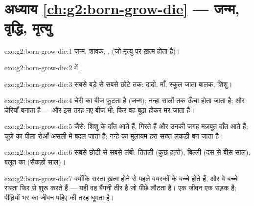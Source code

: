 \section*{अध्याय \ref{ch:g2:born-grow-die} --- जन्म, वृद्धि, मृत्यु}

\begin{solution}{exo:g2:born-grow-die:1}
जन्म, शावक, ,  (जो मृत्यु पर ख़त्म होता है)।
\end{solution}

\begin{solution}{exo:g2:born-grow-die:2}
  में।
\end{solution}

\begin{solution}{exo:g2:born-grow-die:3}
सबसे बड़े से सबसे छोटे तक: दादी, माँ, स्कूल जाता बालक, शिशु।
\end{solution}

\begin{solution}{exo:g2:born-grow-die:4}
चेरी का बीज फूटता है (जन्म); नन्हा  सालों तक ऊँचा होता जाता है;
   और चेरियाँ बनाता है --- और इस तरह नए बीज भी; फिर वह
बूढ़ा होकर मर जाता है।
\end{solution}

\begin{solution}{exo:g2:born-grow-die:5}
जैसे: शिशु के दाँत आते हैं, गिरते हैं और उनकी जगह मज़बूत दाँत आते
हैं; चूज़े का पीला रोआँ असली  में बदल जाता है; नन्हे  का
मुलायम हरा  सख़्त लकड़ी बन जाता है।
\end{solution}

\begin{solution}{exo:g2:born-grow-die:6}
सबसे छोटी से सबसे लंबी: तितली (कुछ हफ़्ते), बिल्ली (दस से बीस साल),
बलूत का  (सैकड़ों साल)।
\end{solution}

\begin{solution}{exo:g2:born-grow-die:7}
क्योंकि रास्ता ख़त्म होने से पहले वयस्कों के बच्चे होते हैं, और वे
बच्चे रास्ता फिर से शुरू करते हैं --- यही वह बैंगनी तीर है जो पीछे
लौटता है। एक जीवन एक सड़क है; पीढ़ियों भर का जीवन पहिए की तरह घूमता
है।
\end{solution}

